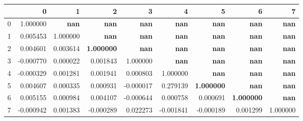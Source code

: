 \begin{tabular}{lrrrrrrrr}
\toprule
 & 0 & 1 & 2 & 3 & 4 & 5 & 6 & 7 \\
\midrule
0 & 1.000000 & \color{f_white} \bfseries nan & \color{f_white} \bfseries nan & \color{f_white} \bfseries nan & \color{f_white} \bfseries nan & \color{f_white} \bfseries nan & \color{f_white} \bfseries nan & \color{f_white} \bfseries nan \\
1 & 0.005453 & 1.000000 & \color{f_white} \bfseries nan & \color{f_white} \bfseries nan & \color{f_white} \bfseries nan & \color{f_white} \bfseries nan & \color{f_white} \bfseries nan & \color{f_white} \bfseries nan \\
2 & 0.004601 & 0.003614 & \color{f_green} \bfseries 1.000000 & \color{f_white} \bfseries nan & \color{f_white} \bfseries nan & \color{f_white} \bfseries nan & \color{f_white} \bfseries nan & \color{f_white} \bfseries nan \\
3 & -0.000770 & 0.000022 & 0.001843 & 1.000000 & \color{f_white} \bfseries nan & \color{f_white} \bfseries nan & \color{f_white} \bfseries nan & \color{f_white} \bfseries nan \\
4 & -0.000329 & 0.001281 & 0.001941 & 0.000803 & 1.000000 & \color{f_white} \bfseries nan & \color{f_white} \bfseries nan & \color{f_white} \bfseries nan \\
5 & 0.004607 & 0.000335 & 0.000931 & -0.000017 & 0.279139 & \color{f_green} \bfseries 1.000000 & \color{f_white} \bfseries nan & \color{f_white} \bfseries nan \\
6 & 0.005155 & 0.000984 & 0.004107 & -0.000644 & 0.000758 & 0.000691 & \color{f_green} \bfseries 1.000000 & \color{f_white} \bfseries nan \\
7 & -0.000942 & 0.001383 & -0.000289 & 0.022273 & -0.001841 & -0.000189 & 0.001299 & 1.000000 \\
\bottomrule
\end{tabular}